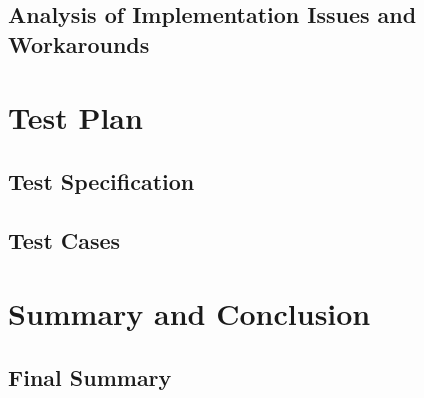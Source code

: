 \documentclass[12pt]{article} %
\begin{document}
\subsection{Analysis of Implementation Issues and Workarounds} %
%
%

\section{Test Plan } %
%

\subsection{Test Specification} %
%
%

\subsection{Test Cases} %
%

\section{Summary and Conclusion}
%

\subsection{Final Summary}
\end{document}
